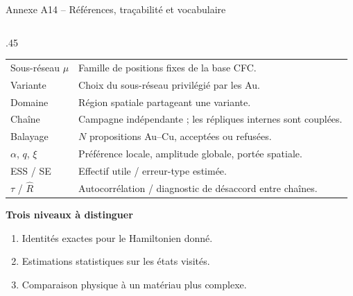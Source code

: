 \documentclass[aspectratio=169,10pt]{beamer}
\newcommand{\tightlist}{\setlength{\itemsep}{2pt}\setlength{\parskip}{0pt}}
\begin{document}
\begin{frame}[t]{Annexe A14 -- Références, traçabilité et vocabulaire}
\begin{columns}[T,onlytextwidth]
\begin{column}{.45\textwidth}
\begin{tabular}{p{.25\linewidth}p{.66\linewidth}}
Sous-réseau $\mu$ & Famille de positions fixes de la base CFC.\\[2pt]
Variante & Choix du sous-réseau privilégié par les Au.\\[2pt]
Domaine & Région spatiale partageant une variante.\\[2pt]
Chaîne & Campagne indépendante ; les répliques internes sont couplées.\\[2pt]
Balayage & $N$ propositions Au--Cu, acceptées ou refusées.\\[2pt]
$\alpha$, $q$, $\xi$ & Préférence locale, amplitude globale, portée spatiale.\\[2pt]
ESS / SE & Effectif utile / erreur-type estimée.\\[2pt]
$\tau$ / $\widehat R$ & Autocorrélation / diagnostic de désaccord entre chaînes.\\\bottomrule
\end{tabular}
\medskip

\textbf{Trois niveaux à distinguer}
\begin{enumerate}\tightlist
\item Identités exactes pour le Hamiltonien donné.
\item Estimations statistiques sur les états visités.
\item Comparaison physique à un matériau plus complexe.
\end{enumerate}
\end{column}
\end{columns}
\end{frame}
\end{document}
